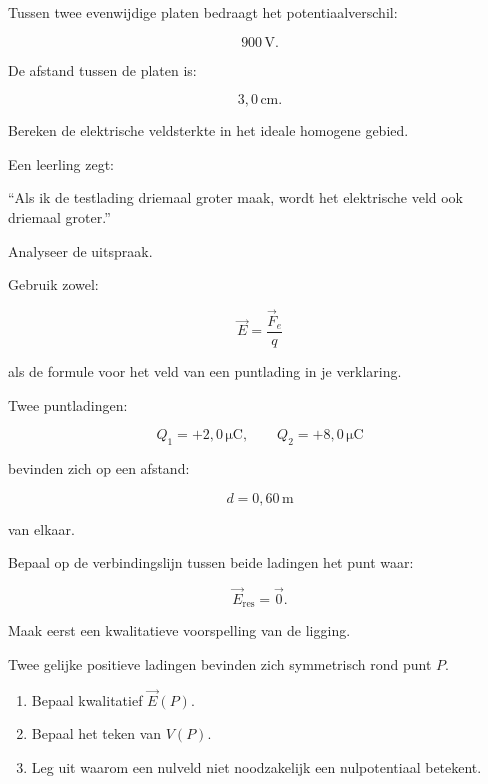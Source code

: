 \documentclass{ximera}
\begin{document}
\begin{oefening}{\oefB\ESS}

Tussen twee evenwijdige platen bedraagt het potentiaalverschil:

\[
900\,\mathrm V.
\]

De afstand tussen de platen is:

\[
3{,}0\,\mathrm{cm}.
\]

Bereken de elektrische veldsterkte in het ideale homogene gebied.

\end{oefening}





\begin{oefening}{\oefU\ESS}

Een leerling zegt:

``Als ik de testlading driemaal groter maak, wordt het elektrische veld
ook driemaal groter.''

Analyseer de uitspraak.

Gebruik zowel:

\[
\vec E=\frac{\vec F_e}{q}
\]

als de formule voor het veld van een puntlading in je verklaring.

\end{oefening}


\begin{oefening}{\oefU\ESS}

Twee puntladingen:

\[
Q_1=+2{,}0\,\mathrm{\mu C},
\qquad
Q_2=+8{,}0\,\mathrm{\mu C}
\]

bevinden zich op een afstand:

\[
d=0{,}60\,\mathrm m
\]

van elkaar.

Bepaal op de verbindingslijn tussen beide ladingen het punt waar:

\[
\vec E_\mathrm{res}=\vec 0.
\]

Maak eerst een kwalitatieve voorspelling van de ligging.

\end{oefening}


\begin{oefening}{\oefU\ESS}

Twee gelijke positieve ladingen bevinden zich symmetrisch rond punt
$P$.

\begin{enumerate}
  \item Bepaal kwalitatief $\vec E(P)$.
  \item Bepaal het teken van $V(P)$.
  \item Leg uit waarom een nulveld niet noodzakelijk een nulpotentiaal
        betekent.
\end{enumerate}

\end{oefening}
\end{document}
